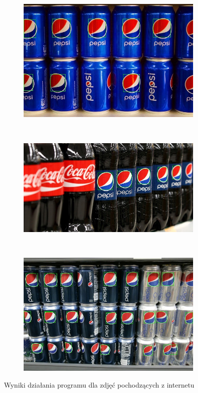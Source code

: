 \documentclass[11pt,a4paper,twoside]{report}
\begin{document}
	\begin{figure}
	    \centering
	    \begin{subfigure}[b]{0.8\textwidth}
	        \includegraphics[width=\textwidth]{img/net/0}
	    \end{subfigure}
	    \\
	    \begin{subfigure}[b]{0.8\textwidth}
	        \includegraphics[width=\textwidth]{img/net/1}
	    \end{subfigure}
	    \\
	    \begin{subfigure}[b]{0.8\textwidth}
	        \includegraphics[width=\textwidth]{img/net/2}
	    \end{subfigure}
	    \caption{Wyniki działania programu dla zdjęć pochodzących z internetu}
	    \label{fig:net-1}
	\end{figure}
\end{document}
